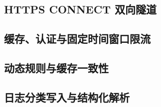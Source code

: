 \documentclass[UTF8,a4paper,10.5pt,fontset=windows]{ctexart}
\begin{document}


\subsection{HTTPS CONNECT 双向隧道}
\label{app:connect}



\subsection{缓存、认证与固定时间窗口限流}
\label{app:runtime}





\subsection{动态规则与缓存一致性}
\label{app:rules}



\subsection{日志分类写入与结构化解析}
\label{app:audit}


\end{document}
